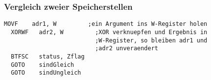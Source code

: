 \subsubsection*{Vergleich zweier Speicherstellen}
\begin{lstlisting}[language={[ARM]Assembler}]
  MOVF    adr1, W         ;ein Argument ins W-Register holen
  XORWF   adr2, W         ;XOR verknuepfen und Ergebnis in 
                          ;W-Register, so bleiben adr1 und 
                          ;adr2 unveraendert
  BTFSC   status, Zflag
  GOTO    sindGleich
  GOTO    sindUngleich
  \end{lstlisting}